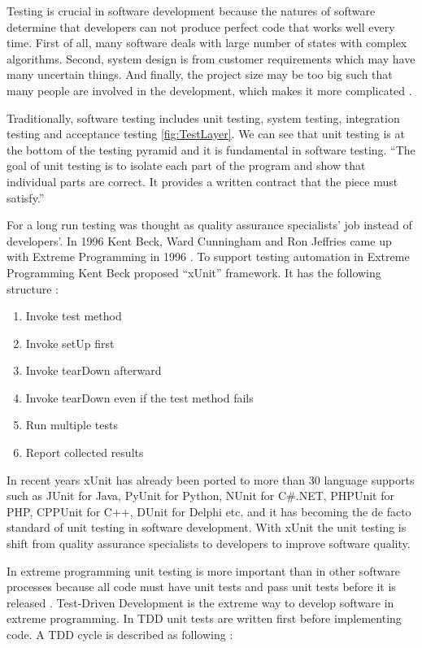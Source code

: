 \documentclass[11pt,twocolumn]{article}
\begin{document}
Testing is crucial in software development because the natures of software
determine that developers can not produce perfect code that works well
every time. First of all, many software deals with large number of states
with complex algorithms. Second, system design is from customer
requirements which may have many uncertain things. And finally, the project
size may be too big such that many people are involved in the development,
which makes it more complicated \cite{Pfleeger:2001}.

Traditionally, software testing includes unit testing, system testing,
integration testing and acceptance testing \ref{fig:TestLayer}. We can see
that unit testing is at the bottom of the testing pyramid and it is
fundamental in software testing. ``The goal of unit testing is to isolate
each part of the program and show that individual parts are correct. It
provides a written contract that the piece must satisfy.''
\cite{UnitTestWiki} 

For a long run testing was thought as quality assurance specialists' job instead of
developers'. In 1996 Kent Beck, Ward Cunningham and Ron Jeffries came up
with Extreme Programming in 1996 \cite{XP96}. To support testing automation
in Extreme Programming Kent Beck proposed ``xUnit'' framework. It has the
following structure \cite{Beck:2003}:

\begin{enumerate}
\item Invoke test method
\item Invoke setUp first
\item Invoke tearDown afterward
\item Invoke tearDown even if the test method fails
\item Run multiple tests
\item Report collected results
\end{enumerate}

In recent years xUnit has already been ported to more than 30 language
supports such as JUnit for Java, PyUnit for Python, NUnit for C\#.NET,
PHPUnit for PHP, CPPUnit for C++, DUnit for Delphi etc. \cite{XPSoftware}
and it has becoming the de facto standard of unit testing in software
development. With xUnit the unit testing is shift from quality assurance
specialists to developers to improve software quality.

In extreme programming unit testing is more important than in other
software processes because all code must have unit tests and pass unit
tests before it is released \cite{XP96}. Test-Driven Development is the
extreme way to develop software in extreme programming. In TDD unit tests
are written first before implementing code. A TDD cycle is described as
following \cite{TDDWiki}:
\end{document}
